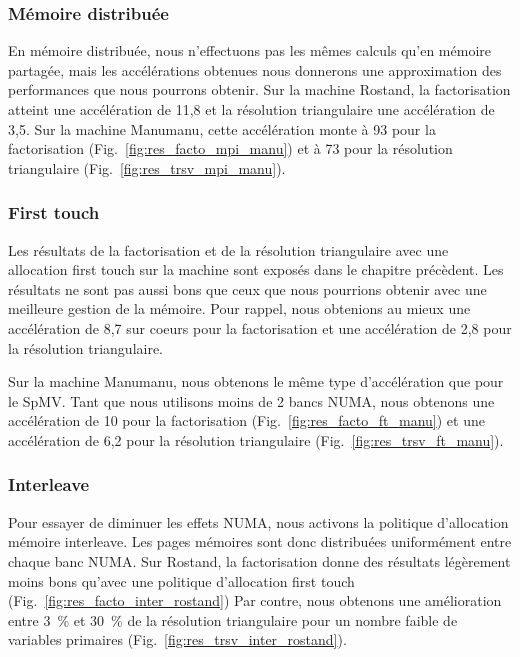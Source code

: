 \subsubsection{Mémoire distribuée}
En mémoire distribuée, nous n'effectuons pas les mêmes calculs qu'en mémoire partagée, mais les accélérations obtenues nous donnerons une approximation des performances que nous pourrons obtenir.
%
Sur la machine Rostand, la factorisation atteint une accélération de 11,8 et la résolution triangulaire une accélération de 3,5.
%
Sur la machine Manumanu, cette accélération monte à 93 pour la factorisation (Fig.~\ref{fig:res_facto_mpi_manu}) et à 73 pour la résolution triangulaire (Fig.~\ref{fig:res_trsv_mpi_manu}).



\subsubsection{First touch}
Les résultats de la factorisation et de la résolution triangulaire avec une allocation first touch sur la machine  sont exposés dans le chapitre précèdent.
%
Les résultats ne sont pas aussi bons que ceux que nous pourrions obtenir avec une meilleure gestion de la mémoire.
%
Pour rappel, nous obtenions au mieux une accélération de 8,7 sur coeurs pour la factorisation et une accélération de 2,8 pour la résolution triangulaire.


Sur la machine Manumanu, nous obtenons le même type d'accélération que pour le SpMV.
%
Tant que nous utilisons moins de 2 bancs NUMA, nous obtenons une accélération de 10 pour la factorisation (Fig.~\ref{fig:res_facto_ft_manu}) et une accélération de 6,2 pour la résolution triangulaire (Fig.~\ref{fig:res_trsv_ft_manu}).


\subsubsection{Interleave}
Pour essayer de diminuer les effets NUMA, nous activons la politique d'allocation mémoire interleave.
%
Les pages mémoires sont donc distribuées uniformément entre chaque banc NUMA.
%
Sur Rostand, la factorisation donne des résultats légèrement moins bons qu'avec une politique d'allocation first touch (Fig.~\ref{fig:res_facto_inter_rostand})
%
Par contre, nous obtenons une amélioration entre 3~\% et 30~\% de la résolution triangulaire pour un nombre faible de variables primaires (Fig.~\ref{fig:res_trsv_inter_rostand}).



